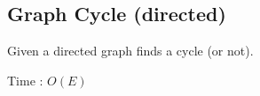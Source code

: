 \subsection{Graph Cycle (directed)}

Given a directed graph finds a cycle (or not).

Time : $O(E)$


